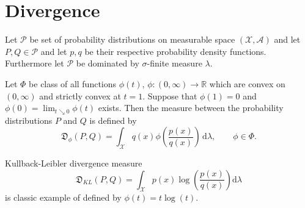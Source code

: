 \chapter{\ren Divergence}
Let $\mathcal{P}$ be set of probability distributions on measurable space $(\mathcal{X, A})$ and let $P,Q \in \mathcal{P} $ and let $p,q$ be their respective probability density functions. Furthermore let $\mathcal{P}$ be dominated by $\sigma$-finite measure $\lambda$.

%
%


\begin{definition}
Let $\Phi$ be class of all functions  $\phi(t)$, $\phi : (0,\infty) \rightarrow \mathbb{R}$ which are convex on $(0,\infty)$ and strictly convex at $t = 1$. Suppose that $\phi(1) = 0$ and $\phi(0) = \lim_{t \searrow 0} \phi(t)$ exists. Then the {\em \phidiv} measure between the probability distributions $P$ and $Q$ is defined by 
\begin{equation}
\mathfrak{D}_\phi(P,Q) = \int_\mathcal{X} q(x) \phi \left( \frac{p(x)}{q(x)}\right) \,\mathrm{d}\lambda , \qquad \phi \in \Phi.
\label{eq:phiDiv}
\end{equation}
\label{def:phiDiv}
\end{definition}
\noindent Kullback-Leibler divergence measure 
\begin{equation}
\mathfrak{D}_{KL}(P,Q) =  \int_\mathcal{X} p(x)\log\left( \frac{p(x)}{q(x)}\right) \mathrm{d}\lambda
\end{equation}
is classic example of \phidiv defined by $\phi(t) = t\log(t)$.

